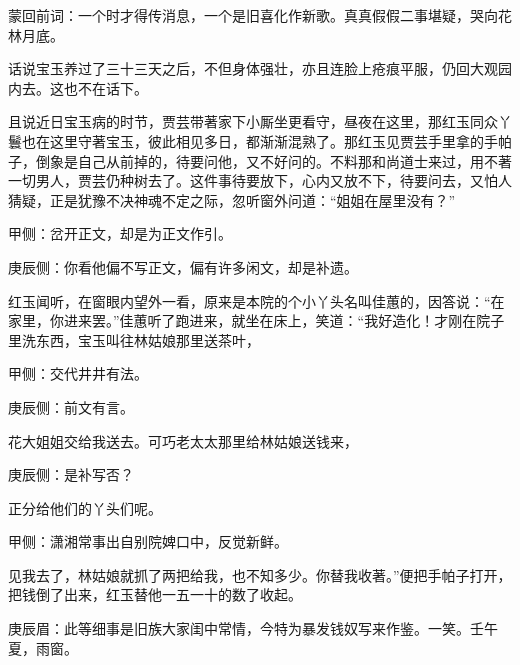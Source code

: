 

\begin{parag}
    \begin{note}蒙回前词：一个时才得传消息，一个是旧喜化作新歌。真真假假二事堪疑，哭向花林月底。\end{note}
\end{parag}


\begin{parag}
    话说宝玉养过了三十三天之后，不但身体强壮，亦且连脸上疮痕平服，仍回大观园内去。这也不在话下。
\end{parag}


\begin{parag}
    且说近日宝玉病的时节，贾芸带著家下小厮坐更看守，昼夜在这里，那红玉同众丫鬟也在这里守著宝玉，彼此相见多日，都渐渐混熟了。那红玉见贾芸手里拿的手帕子，倒象是自己从前掉的，待要问他，又不好问的。不料那和尚道士来过，用不著一切男人，贾芸仍种树去了。这件事待要放下，心内又放不下，待要问去，又怕人猜疑，正是犹豫不决神魂不定之际，忽听窗外问道：“姐姐在屋里没有？”\begin{note}甲侧：岔开正文，却是为正文作引。\end{note}\begin{note}庚辰侧：你看他偏不写正文，偏有许多闲文，却是补遗。\end{note}红玉闻听，在窗眼内望外一看，原来是本院的个小丫头名叫佳蕙的，因答说：“在家里，你进来罢。”佳蕙听了跑进来，就坐在床上，笑道：“我好造化！才刚在院子里洗东西，宝玉叫往林姑娘那里送茶叶，\begin{note}甲侧：交代井井有法。\end{note}\begin{note}庚辰侧：前文有言。\end{note}花大姐姐交给我送去。可巧老太太那里给林姑娘送钱来，\begin{note}庚辰侧：是补写否？\end{note}正分给他们的丫头们呢。\begin{note}甲侧：潇湘常事出自别院婢口中，反觉新鲜。\end{note}见我去了，林姑娘就抓了两把给我，也不知多少。你替我收著。”便把手帕子打开，把钱倒了出来，红玉替他一五一十的数了收起。\begin{note}庚辰眉：此等细事是旧族大家闺中常情，今特为暴发钱奴写来作鉴。一笑。壬午夏，雨窗。\end{note}
\end{parag}


